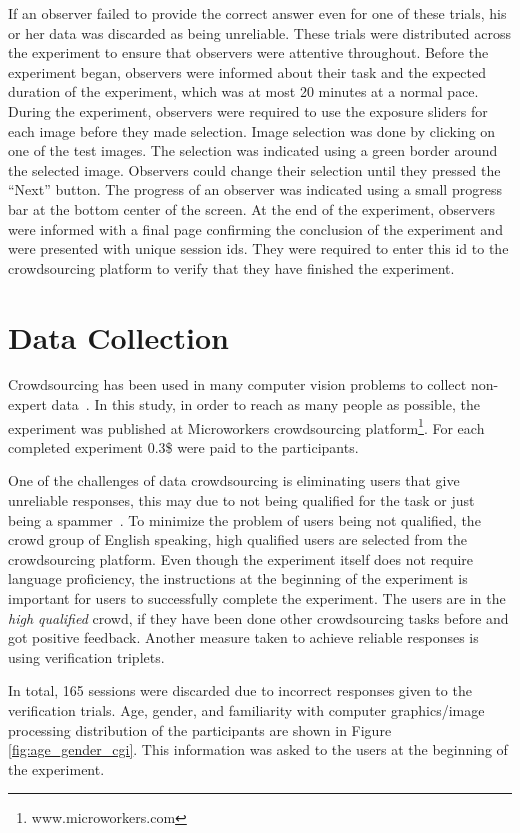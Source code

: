 If an observer failed to provide the correct answer even for one of these trials, his or her data was discarded as being unreliable. These trials were distributed across the experiment to ensure that observers were attentive throughout. Before the experiment began, observers were informed about their task and the expected duration of the experiment, which was at most 20 minutes at a normal pace. During the experiment, observers were required to use the exposure sliders for each image before they made selection. Image selection was done by clicking on one of the test images. The selection was indicated using a green border around the selected image. Observers could change their selection until they pressed the “Next” button. The progress of an observer was indicated using a small progress bar at the bottom center of the screen. At the end of the experiment, observers were informed with a final page confirming the conclusion of the experiment and were presented with unique session ids. They were required to enter this id to the crowdsourcing platform to verify that they have finished the experiment.

\section{Data Collection}
Crowdsourcing has been used in many computer vision problems to collect non-expert data~\cite{kovashka2016crowdsourcing}. In this study, in order to reach as many people as possible, the experiment was published at Microworkers crowdsourcing platform\footnote{www.microworkers.com}. For each completed experiment 0.3\$ were paid to the participants.

One of the challenges of data crowdsourcing is eliminating users that give unreliable responses, this may due to not being qualified for the task or just being a spammer~\cite{garcia2016challenges}. To minimize the problem of users being not qualified, the crowd group of English speaking, high qualified users are selected from the crowdsourcing platform. Even though the experiment itself does not require language proficiency, the instructions at the beginning of the experiment is important for users to successfully complete the experiment. The users are in the \emph{high qualified} crowd, if they have been done other crowdsourcing tasks before and got positive feedback. Another measure taken to achieve reliable responses is using verification triplets.

In total, 165 sessions were discarded due to incorrect responses given to the verification trials. Age, gender, and familiarity with computer graphics/image processing distribution of the participants are shown in Figure \ref{fig:age_gender_cgi}. This information was asked to the users at the beginning of the experiment.


